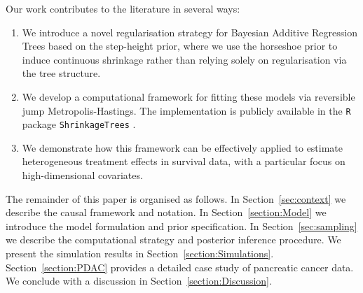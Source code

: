 Our work contributes to the literature in several ways:
\begin{enumerate}
    \item We introduce a novel regularisation strategy for Bayesian Additive Regression Trees based on the step-height prior, where we use the horseshoe prior to induce continuous shrinkage rather than relying solely on regularisation via the tree structure.
    \item We develop a computational framework for fitting these models via reversible jump Metropolis-Hastings. The implementation is publicly available in the \texttt{R} package \texttt{ShrinkageTrees} \citep{ShrinkageTreesR}.
    \item We demonstrate how this framework can be effectively applied to estimate heterogeneous treatment effects in survival data, with a particular focus on high-dimensional covariates.
\end{enumerate}

The remainder of this paper is organised as follows.
In Section~\ref{sec:context} we describe the causal framework and notation.
In Section~\ref{section:Model} we introduce the model formulation and prior specification. 
In Section~\ref{sec:sampling} we describe the computational strategy and posterior inference procedure. 
We present the simulation results in Section~\ref{section:Simulations}.
Section~\ref{section:PDAC} provides a detailed case study of pancreatic cancer data. 
We conclude with a discussion in Section~\ref{section:Discussion}.



